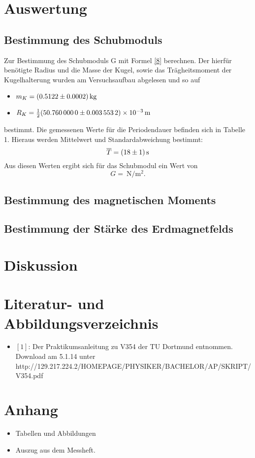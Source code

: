 \documentclass[11pt,ngerman,a4paper]{article}
\begin{document}
\section{Auswertung}

\subsection{Bestimmung des Schubmoduls}
Zur Bestimmung des Schubmoduls G mit Formel \ref{8} berechnen. Der hierfür benötigte Radius und die Masse der Kugel, sowie das Trägheitsmoment der Kugelhalterung wurden am Versuchsaufbau abgelesen und so auf
\begin{itemize}
\item $m_K = \SI{0,5122+-0,0002}{\kilo\gram}$
\item $R_K = \frac{1}{2} \SI{50,76+-0.0035532e-3}{\metre}$
\end{itemize}
bestimmt. Die gemessenen Werte für die Periodendauer befinden sich in Tabelle 1. Hieraus werden Mittelwert und Standardabweichung bestimmt:
\[
\overline{T} = \SI{18+-1}{\second}
\]
Aus diesen Werten ergibt sich für das Schubmodul ein Wert von
\[
G = \SI{}{\newton\per\meter\squared}.
\]

\subsection{Bestimmung des magnetischen Moments}

\subsection{Bestimmung der Stärke des Erdmagnetfelds}

\section{Diskussion}

\section{Literatur- und Abbildungsverzeichnis}
\begin{itemize}
\item $[1]$: Der Praktikumsanleitung zu V354 der TU Dortmund entnommen. Download am 5.1.14 unter \newline http://129.217.224.2/HOMEPAGE/PHYSIKER/BACHELOR/AP/SKRIPT/V354.pdf
\end{itemize}
\section{Anhang}
\begin{itemize}
\item Tabellen und Abbildungen
\item Auszug aus dem Messheft.


\end{itemize}
\end{document}
